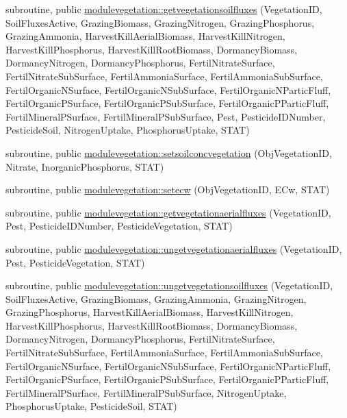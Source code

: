 \begin{DoxyCompactItemize}
subroutine, public \mbox{\hyperlink{namespacemodulevegetation_a5ab5e21fef383950e0f159dd2ad953aa}{modulevegetation\+::getvegetationsoilfluxes}} (Vegetation\+ID, Soil\+Fluxes\+Active, Grazing\+Biomass, Grazing\+Nitrogen, Grazing\+Phosphorus, Grazing\+Ammonia, Harvest\+Kill\+Aerial\+Biomass, Harvest\+Kill\+Nitrogen, Harvest\+Kill\+Phosphorus, Harvest\+Kill\+Root\+Biomass, Dormancy\+Biomass, Dormancy\+Nitrogen, Dormancy\+Phosphorus, Fertil\+Nitrate\+Surface, Fertil\+Nitrate\+Sub\+Surface, Fertil\+Ammonia\+Surface, Fertil\+Ammonia\+Sub\+Surface, Fertil\+Organic\+N\+Surface, Fertil\+Organic\+N\+Sub\+Surface, Fertil\+Organic\+N\+Partic\+Fluff, Fertil\+Organic\+P\+Surface, Fertil\+Organic\+P\+Sub\+Surface, Fertil\+Organic\+P\+Partic\+Fluff, Fertil\+Mineral\+P\+Surface, Fertil\+Mineral\+P\+Sub\+Surface, Pest, Pesticide\+I\+D\+Number, Pesticide\+Soil, Nitrogen\+Uptake, Phosphorus\+Uptake, S\+T\+AT)
\item 
subroutine, public \mbox{\hyperlink{namespacemodulevegetation_a38d68bd81032a262aeb48e983401e19a}{modulevegetation\+::setsoilconcvegetation}} (Obj\+Vegetation\+ID, Nitrate, Inorganic\+Phosphorus, S\+T\+AT)
\item 
subroutine, public \mbox{\hyperlink{namespacemodulevegetation_af9791218901ea10557b2795395421159}{modulevegetation\+::setecw}} (Obj\+Vegetation\+ID, E\+Cw, S\+T\+AT)
\item 
subroutine, public \mbox{\hyperlink{namespacemodulevegetation_a2c86b41a4e32d9f80ab445ee7695a777}{modulevegetation\+::getvegetationaerialfluxes}} (Vegetation\+ID, Pest, Pesticide\+I\+D\+Number, Pesticide\+Vegetation, S\+T\+AT)
\item 
subroutine, public \mbox{\hyperlink{namespacemodulevegetation_a820fdd3d0dd1463d385d92be5758637b}{modulevegetation\+::ungetvegetationaerialfluxes}} (Vegetation\+ID, Pest, Pesticide\+Vegetation, S\+T\+AT)
\item 
subroutine, public \mbox{\hyperlink{namespacemodulevegetation_a96e88e3033a51f7458b1307ffccc0e3a}{modulevegetation\+::ungetvegetationsoilfluxes}} (Vegetation\+ID, Soil\+Fluxes\+Active, Grazing\+Biomass, Grazing\+Ammonia, Grazing\+Nitrogen, Grazing\+Phosphorus, Harvest\+Kill\+Aerial\+Biomass, Harvest\+Kill\+Nitrogen, Harvest\+Kill\+Phosphorus, Harvest\+Kill\+Root\+Biomass, Dormancy\+Biomass, Dormancy\+Nitrogen, Dormancy\+Phosphorus, Fertil\+Nitrate\+Surface, Fertil\+Nitrate\+Sub\+Surface, Fertil\+Ammonia\+Surface, Fertil\+Ammonia\+Sub\+Surface, Fertil\+Organic\+N\+Surface, Fertil\+Organic\+N\+Sub\+Surface, Fertil\+Organic\+N\+Partic\+Fluff, Fertil\+Organic\+P\+Surface, Fertil\+Organic\+P\+Sub\+Surface, Fertil\+Organic\+P\+Partic\+Fluff, Fertil\+Mineral\+P\+Surface, Fertil\+Mineral\+P\+Sub\+Surface, Nitrogen\+Uptake, Phosphorus\+Uptake, Pesticide\+Soil, S\+T\+AT)

\end{DoxyCompactItemize}

